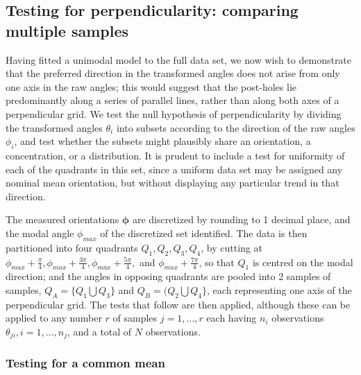 \documentclass[../../ArchStats.tex]{subfiles}
\begin{document}
\subsection{Testing for perpendicularity: comparing multiple samples}
\label{sec:similarity-tests}

Having fitted a unimodal model to the full data set, we now wish to demonstrate that the preferred direction in the transformed angles does not arise from only one axis in the raw angles; this would suggest that the post-holes lie predominantly along a series of parallel lines, rather than along both axes of a perpendicular grid. We test the null hypothesis of perpendicularity by dividing the transformed angles $\theta_i$ into subsets according to the direction of the raw angles $\phi_i$, and test whether the subsets might plausibly share an orientation, a concentration, or a distribution. It is prudent to include a test for uniformity of each of the quadrants in this set, since a uniform data set may be assigned any nominal mean orientation, but without displaying any particular trend in that direction.

The measured orientations $\boldsymbol{\phi}$ are discretized by rounding to 1 decimal place, and the modal angle $\phi_{max}$ of the discretized set identified. The data is then partitioned into four quadrants $Q_1, Q_2, Q_3, Q_4$, by cutting at $\phi_{max} + \frac{\pi}{4}, \phi_{max} + \frac{3\pi}{4}, \phi_{max} + \frac{5\pi}{4},$ and $\phi_{max} + \frac{7\pi}{4}$, so that $Q_1$ is centred on the modal direction; and the angles in opposing quadrants are pooled into 2 samples of samples, $Q_A = \{Q_1 \bigcup Q_3\}$ and $Q_B = (Q_2 \bigcup Q_4\}$, each representing one axis of the perpendicular grid. The tests that follow are then applied, although these can be applied to any number $r$ of samples $j = 1, \dots, r$ each having $n_i$ observations $\theta_{ji}, i = 1, \dots, n_j$, and a total of $N$ observations.


\subsubsection{Testing for a common mean}
\label{sec:common-mean-test}
\end{document}
